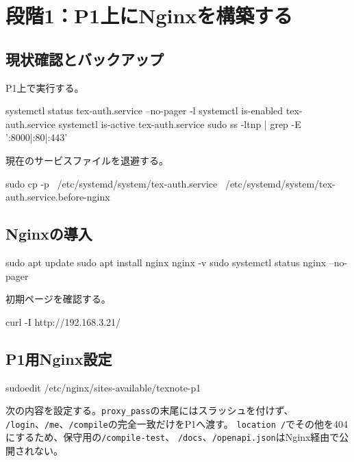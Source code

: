 \documentclass[uplatex,a4paper,11pt]{jsarticle}
\begin{document}
\newpage
\section{段階1：P1上にNginxを構築する}

\subsection{現状確認とバックアップ}

P1上で実行する。

\begin{command}
systemctl status tex-auth.service --no-pager -l
systemctl is-enabled tex-auth.service
systemctl is-active tex-auth.service
sudo ss -ltnp | grep -E ':8000|:80|:443'
\end{command}

現在のサービスファイルを退避する。

\begin{command}
sudo cp -p \
  /etc/systemd/system/tex-auth.service \
  /etc/systemd/system/tex-auth.service.before-nginx
\end{command}

\subsection{Nginxの導入}

\begin{command}
sudo apt update
sudo apt install nginx
nginx -v
sudo systemctl status nginx --no-pager
\end{command}

初期ページを確認する。

\begin{command}
curl -I http://192.168.3.21/
\end{command}

\subsection{P1用Nginx設定}

\begin{command}
sudoedit /etc/nginx/sites-available/texnote-p1
\end{command}

次の内容を設定する。\texttt{proxy\_pass}の末尾にはスラッシュを付けず、
\texttt{/login}、\texttt{/me}、\texttt{/compile}の完全一致だけをP1へ渡す。
\texttt{location /}でその他を404にするため、保守用の\texttt{/compile-test}、
\texttt{/docs}、\texttt{/openapi.json}はNginx経由で公開されない。
\end{document}
